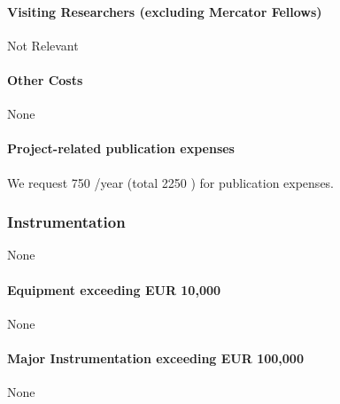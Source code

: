 \documentclass[10pt,fleqn,twoside]{article}
\begin{document}
\paragraph{Visiting Researchers (excluding Mercator Fellows)}

Not Relevant 


\paragraph{Other Costs}

None

\paragraph{Project-related publication expenses}

We request 750 \EUR{}/year (total 2250 \EUR{}) for publication expenses.

\subsubsection{Instrumentation}

None 

\paragraph{Equipment exceeding EUR 10,000} 

None

\paragraph{Major Instrumentation exceeding EUR 100,000} 

None

% 
% 
% 
% 
% 
% 
% 
\end{document}
